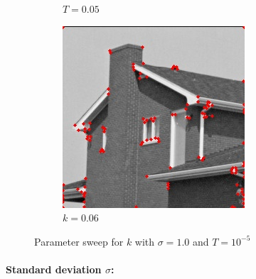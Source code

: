 \documentclass[10pt,a4paper,twoside]{article}
\newcommand{\sweepsize}{0.26}
\begin{document}
\begin{figure}[h]
\begin{subfigure}{\sweepsize\textwidth}
    \caption{$T=0.05$}
    \end{subfigure}
    \begin{subfigure}{\sweepsize\textwidth}
    \includegraphics[width=0.9\linewidth, height=0.9\linewidth]{sweep_house/house_10_006_1e-05.jpg} 
    \caption{$k=0.06$}
    \end{subfigure}
    \caption{Parameter sweep for $k$ with $\sigma=1.0$ and $T=10^{-5}$}

\end{figure}

\paragraph*{Standard deviation $\sigma$:}
\end{document}
